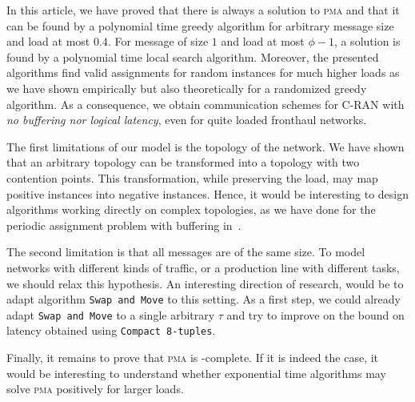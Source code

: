 \documentclass[a4paper,UKenglish,cleveref, autoref, thm-restate]{lipics-v2019}
\newcommand\pma{\textsc{pma}\xspace}
\newcommand\swapandmove{\texttt{Swap and Move}\xspace}
\begin{document}
In this article, we have proved that there is always a solution to \pma and that it can be found by a polynomial time greedy algorithm for arbitrary message size and load at most $0.4$. For message of size $1$ and load at most $\phi - 1$, a solution is found by a polynomial time local search algorithm. Moreover, the presented algorithms find valid assignments for random instances for much higher loads as we have shown empirically but also theoretically for a randomized greedy algorithm. As a consequence, we obtain communication schemes for C-RAN with \emph{no buffering nor logical latency}, even for quite loaded fronthaul networks.

The first limitations of our model is the topology of the network. We have shown that an arbitrary topology can be transformed into a topology with two contention points. This transformation, while preserving the load, may map positive instances into negative instances. Hence, it would be interesting to design algorithms working directly on complex topologies, as we have done for the periodic assignment problem with buffering in~\cite{guiraud2021deterministic}.

The second limitation is that all messages are of the same size. 
To model networks with different kinds of traffic, or a production line with different tasks, we should relax this hypothesis. An interesting direction of research, would be to adapt algorithm \swapandmove to this setting. As a first step, we could already adapt \swapandmove to a single arbitrary $\tau$ and try to improve on the bound on latency obtained using \texttt{Compact 8-tuples}.

Finally, it remains to prove that \pma is \NP-complete. If it is indeed the case,
it would be interesting to understand whether exponential time algorithms may solve \pma positively for larger loads. 


\end{document}
